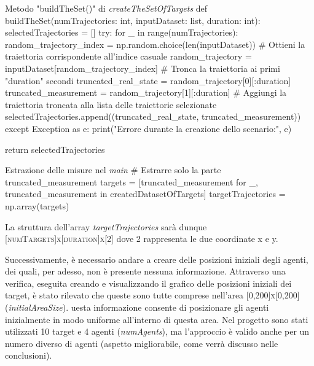 \documentclass[twoside]{article}
\begin{document}
\begin{code}{Metodo "buildTheSet()" di \textit{createTheSetOfTargets}}
def buildTheSet(numTrajectories: int, inputDataset: list, duration: int):
    selectedTrajectories = []
    try:
        for _ in range(numTrajectories):
            random_trajectory_index = np.random.choice(len(inputDataset))
            # Ottieni la traiettoria corrispondente all'indice casuale
            random_trajectory = inputDataset[random_trajectory_index]
            # Tronca la traiettoria ai primi "duration" secondi
            truncated_real_state = random_trajectory[0][:duration]
            truncated_measurement = random_trajectory[1][:duration]
            # Aggiungi la traiettoria troncata alla lista delle traiettorie selezionate
            selectedTrajectories.append((truncated_real_state, truncated_measurement))
    except Exception as e:
        print("Errore durante la creazione dello scenario:", e)
    
    return selectedTrajectories
\end{code}

\begin{code}{Estrazione delle misure nel \textit{main}}
# Estrarre solo la parte truncated_measurement
    targets = [truncated_measurement for _, truncated_measurement in createdDatasetOfTargets]
    targetTrajectories = np.array(targets)
\end{code}

La struttura dell'array \textit{targetTrajectories} sarà dunque \textsc{[numTargets]x[duration]x[2]} dove 2 rappresenta le due coordinate x e y.

\vspace{\baselineskip}

Successivamente, è necessario andare a creare delle posizioni iniziali degli agenti, dei quali, per adesso, non è presente nessuna informazione. Attraverso una verifica, eseguita creando e visualizzando il grafico delle posizioni iniziali dei target, è stato rilevato che queste sono tutte comprese nell'area \textsc{[0,200]x[0,200]} (\textit{initialAreaSize}). uesta informazione consente di posizionare gli agenti inizialmente in modo uniforme all'interno di questa area. Nel progetto sono stati utilizzati 10 target e 4 agenti (\textit{numAgents}), ma l'approccio è valido anche per un numero diverso di agenti (aspetto migliorabile, come verrà discusso nelle conclusioni).
\end{document}
